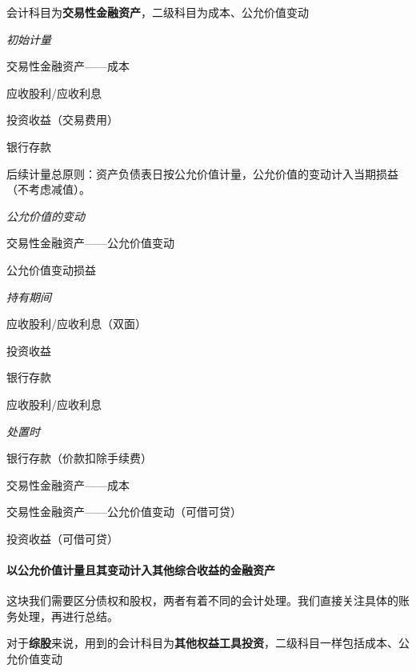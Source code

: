 \documentclass[UTF8,12pt]{ctexart}
\newenvironment{Dr}{%
	\begin{list}{}%
		{
			\setlength{\leftmargin}{2em}
			\setlength{\labelwidth}{2em}
			\setlength{\labelsep}{0pt}
			\setlength{\itemindent}{0pt}
			\setlength{\listparindent}{0pt}
			\setlength{\parsep}{0pt}
			\setlength{\topsep}{0pt}
		}
		\item[\textbf{借：}]
	}{%
	\end{list}
}
\newenvironment{Cr}{%
	\begin{list}{}%
		{
			\setlength{\leftmargin}{3em}
			\setlength{\labelwidth}{2em}
			\setlength{\labelsep}{0pt}
			\setlength{\itemindent}{0pt}
			\setlength{\listparindent}{0pt}
			\setlength{\parsep}{0pt}
			\setlength{\topsep}{0pt}
		}
		\item[\textbf{贷：}]
	}{%
	\end{list}
}
\numberwithin{equation}{section} %
\numberwithin{figure}{section}
\numberwithin{table}{section}
\begin{document}
	会计科目为\textbf{交易性金融资产}，二级科目为成本、公允价值变动
	
	\textit{初始计量}
	
	\begin{Dr}
		交易性金融资产——成本
		
		应收股利/应收利息
		
		投资收益（交易费用）
	\end{Dr}
	\begin{Cr}
		银行存款
	\end{Cr}

	
	后续计量总原则：资产负债表日按公允价值计量，公允价值的变动计入当期损益（不考虑减值）。
	
	\textit{公允价值的变动}
	
	\begin{Dr}
		交易性金融资产——公允价值变动
	\end{Dr}
	\begin{Cr}
		公允价值变动损益
	\end{Cr}

	\textit{持有期间}
	
	\begin{Dr}
		应收股利/应收利息（双面）
	\end{Dr}
	\begin{Cr}
		投资收益
	\end{Cr}
	\begin{Dr}
		银行存款
	\end{Dr}
	\begin{Cr}
		应收股利/应收利息
	\end{Cr}
	
	\textit{处置时}
	
	\begin{Dr}
		银行存款（价款扣除手续费）
	\end{Dr}
	\begin{Cr}
		交易性金融资产——成本
		
		交易性金融资产——公允价值变动（可借可贷）
		
		投资收益（可借可贷）
	\end{Cr}	
	
	
	
	\paragraph{以公允价值计量且其变动计入其他综合收益的金融资产}
	这块我们需要区分债权和股权，两者有着不同的会计处理。我们直接关注具体的账务处理，再进行总结。
	
	对于\textbf{综股}来说，用到的会计科目为\textbf{其他权益工具投资}，二级科目一样包括成本、公允价值变动
	
\end{document}
